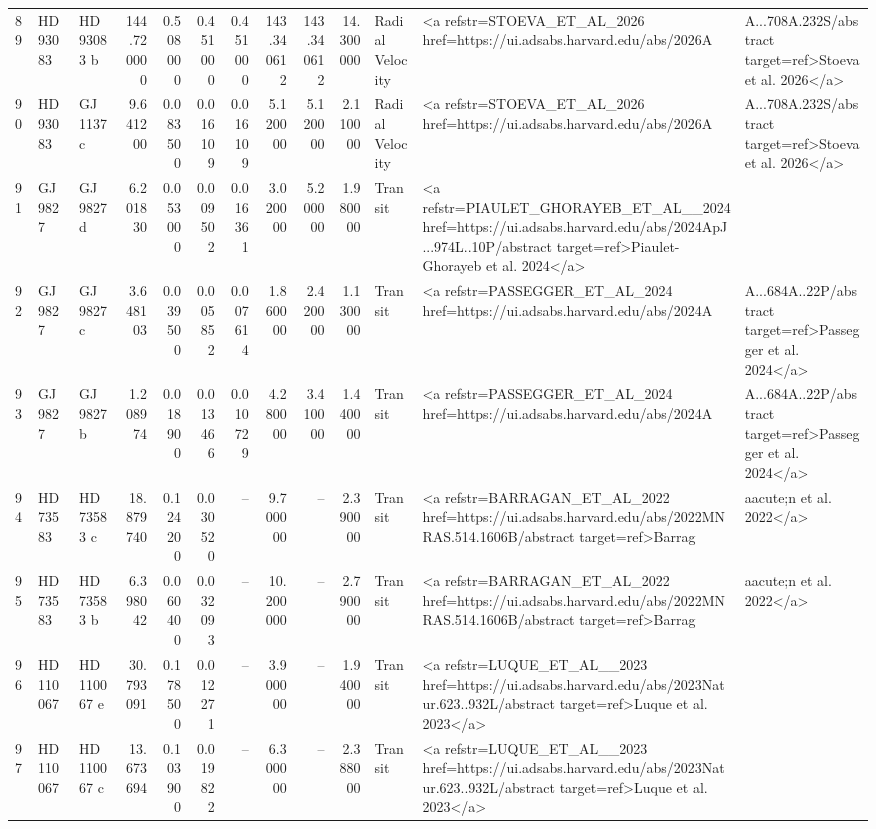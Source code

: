 \begin{tabular}{lllrrrrrrrll}
89 & HD 93083 & HD 93083 b & 144.720000 & 0.508000 & 0.451000 & 0.451000 & 143.340612 & 143.340612 & 14.300000 & Radial Velocity & <a refstr=STOEVA_ET_AL_2026 href=https://ui.adsabs.harvard.edu/abs/2026A&A...708A.232S/abstract target=ref>Stoeva et al. 2026</a> \\
90 & HD 93083 & GJ 1137 c & 9.641200 & 0.083500 & 0.016109 & 0.016109 & 5.120000 & 5.120000 & 2.110000 & Radial Velocity & <a refstr=STOEVA_ET_AL_2026 href=https://ui.adsabs.harvard.edu/abs/2026A&A...708A.232S/abstract target=ref>Stoeva et al. 2026</a> \\
91 & GJ 9827 & GJ 9827 d & 6.201830 & 0.053000 & 0.009502 & 0.016361 & 3.020000 & 5.200000 & 1.980000 & Transit & <a refstr=PIAULET_GHORAYEB_ET_AL__2024 href=https://ui.adsabs.harvard.edu/abs/2024ApJ...974L..10P/abstract target=ref>Piaulet-Ghorayeb et al. 2024</a> \\
92 & GJ 9827 & GJ 9827 c & 3.648103 & 0.039500 & 0.005852 & 0.007614 & 1.860000 & 2.420000 & 1.130000 & Transit & <a refstr=PASSEGGER_ET_AL_2024 href=https://ui.adsabs.harvard.edu/abs/2024A&A...684A..22P/abstract target=ref>Passegger et al. 2024</a> \\
93 & GJ 9827 & GJ 9827 b & 1.208974 & 0.018900 & 0.013466 & 0.010729 & 4.280000 & 3.410000 & 1.440000 & Transit & <a refstr=PASSEGGER_ET_AL_2024 href=https://ui.adsabs.harvard.edu/abs/2024A&A...684A..22P/abstract target=ref>Passegger et al. 2024</a> \\
94 & HD 73583 & HD 73583 c & 18.879740 & 0.124200 & 0.030520 & -- & 9.700000 & -- & 2.390000 & Transit & <a refstr=BARRAGAN_ET_AL_2022 href=https://ui.adsabs.harvard.edu/abs/2022MNRAS.514.1606B/abstract target=ref>Barrag&aacute;n et al. 2022</a> \\
95 & HD 73583 & HD 73583 b & 6.398042 & 0.060400 & 0.032093 & -- & 10.200000 & -- & 2.790000 & Transit & <a refstr=BARRAGAN_ET_AL_2022 href=https://ui.adsabs.harvard.edu/abs/2022MNRAS.514.1606B/abstract target=ref>Barrag&aacute;n et al. 2022</a> \\
96 & HD 110067 & HD 110067 e & 30.793091 & 0.178500 & 0.012271 & -- & 3.900000 & -- & 1.940000 & Transit & <a refstr=LUQUE_ET_AL__2023 href=https://ui.adsabs.harvard.edu/abs/2023Natur.623..932L/abstract target=ref>Luque et al. 2023</a> \\
97 & HD 110067 & HD 110067 c & 13.673694 & 0.103900 & 0.019822 & -- & 6.300000 & -- & 2.388000 & Transit & <a refstr=LUQUE_ET_AL__2023 href=https://ui.adsabs.harvard.edu/abs/2023Natur.623..932L/abstract target=ref>Luque et al. 2023</a> \\

\end{tabular}
